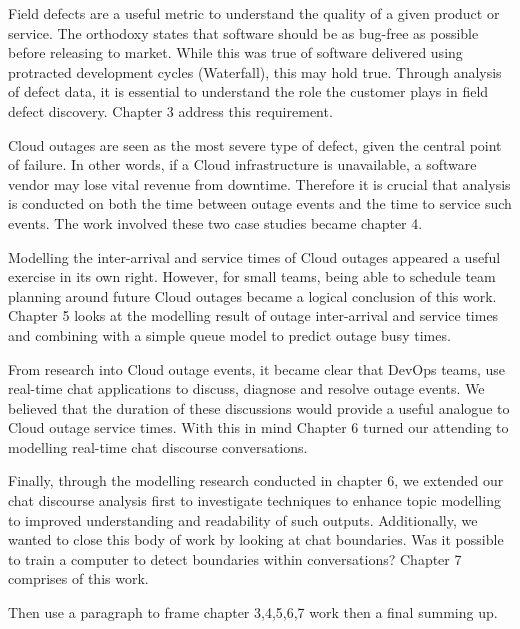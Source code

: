 Field defects are a useful metric to understand the quality of a given product or service. The orthodoxy states that software should be as bug-free as possible before releasing to market. While this was true of software delivered using protracted development cycles (Waterfall), this may hold true. Through analysis of defect data, it is essential to understand the role the customer plays in field defect discovery. Chapter 3 address this requirement. 

Cloud outages are seen as the most severe type of defect, given the central point of failure. In other words, if a Cloud infrastructure is unavailable, a software vendor may lose vital revenue from downtime. Therefore it is crucial that analysis is conducted on both the time between outage events and the time to service such events. The work involved these two case studies became chapter 4.

Modelling the inter-arrival and service times of Cloud outages appeared a useful exercise in its own right. However, for small teams, being able to schedule team planning around future Cloud outages became a logical conclusion of this work. Chapter 5 looks at the modelling result of outage inter-arrival and service times and combining with a simple queue model to predict outage busy times. 

From research into Cloud outage events, it became clear that DevOps teams, use real-time chat applications to discuss, diagnose and resolve outage events. We believed that the duration of these discussions would provide a useful analogue to Cloud outage service times. With this in mind Chapter 6 turned our attending to modelling real-time chat discourse conversations.

Finally, through the modelling research conducted in chapter 6, we extended our chat discourse analysis first to investigate techniques to enhance topic modelling to improved understanding and readability of such outputs. Additionally, we wanted to close this body of work by looking at chat boundaries. Was it possible to train a computer to detect boundaries within conversations? Chapter 7 comprises of this work. 









Then use a paragraph to frame chapter 3,4,5,6,7 work then a final summing up.







